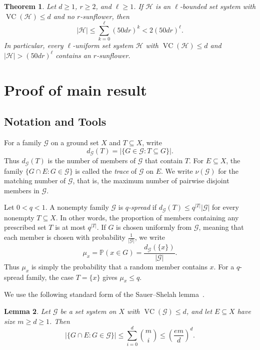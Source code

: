 \documentclass[10pt,a4paper]{amsart}
\newtheorem{theorem}{Theorem}[section]
\newtheorem{lemma}[theorem]{Lemma}
\newcommand*{\abs}[1]{\lvert#1\rvert}
\newcommand{\cG}{\mathcal{G}}
\newcommand{\cH}{\mathcal{H}}
\newcommand{\VC}{\operatorname{VC}}
\begin{document}
\begin{theorem}\label{thm:main}
Let \(d\ge 1\), \(r\ge 2\), and \(\ell\ge 1\). If \(\cH\) is an \(\ell\)-bounded set system with \(\VC(\cH)\le d\) and no \(r\)-sunflower, then
\[
\abs{\cH}\le \sum_{k=0}^{\ell}(50dr)^{k}<2(50dr)^{\ell}.
\]
In particular, every \(\ell\)-uniform set system \(\cH\) with \(\VC(\cH)\le d\) and \(\abs{\cH}>(50dr)^{\ell}\) contains an \(r\)-sunflower.
\end{theorem}


\section{Proof of main result}

\subsection{Notation and Tools}
For a family \(\cG\) on a ground set \(X\) and \(T\subseteq X\), write
\[
d_{\cG}(T)=\abs{\{G\in\cG:T\subseteq G\}}.
\]
Thus \(d_{\cG}(T)\) is the number of members of \(\cG\) that contain \(T\).
For \(E\subseteq X\), the family \(\{G\cap E:G\in\cG\}\) is called the \emph{trace} of \(\cG\) on \(E\). We write \(\nu(\cG)\) for the matching number of \(\cG\), that is, the maximum number of pairwise disjoint members in \(\cG\).

Let \(0<q<1\). A nonempty family \(\cG\) is \emph{\(q\)-spread} if \(d_{\cG}(T)\le q^{\abs{T}}\abs{\cG}\) for every nonempty \(T\subseteq X\). In other words, the proportion of members containing any prescribed set \(T\) is at most \(q^{\abs{T}}\). If \(G\) is chosen uniformly from \(\cG\), meaning that each member is chosen with probability \(\frac{1}{\abs{\cG}}\), we write
\[
\mu_{x}=\mathbb{P}(x\in G)=\frac{d_{\cG}(\{x\})}{\abs{\cG}}.
\]
Thus \(\mu_{x}\) is simply the probability that a random member contains \(x\). For a \(q\)-spread family, the case \(T=\{x\}\) gives \(\mu_{x}\le q\).

We use the following standard form of the Sauer--Shelah lemma~\cite{Sauer72,Shelah72,VC71}.

\begin{lemma}\label{lem:sauer}
Let \(\cG\) be a set system on \(X\) with \(\VC(\cG)\le d\), and let \(E\subseteq X\) have size \(m\ge d\ge 1\). Then
\[
\abs{\{G\cap E:G\in\cG\}}\le \sum_{i=0}^{d}\binom{m}{i}\le \left(\frac{em}{d}\right)^{d}.
\]
\end{lemma}
\end{document}
